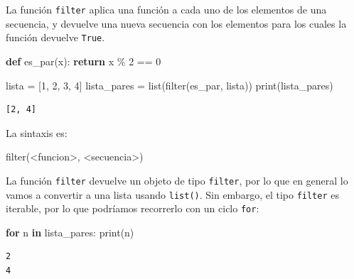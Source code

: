 \documentclass[
  letterpaper,
  DIV=11,
  numbers=noendperiod]{scrreprt}
\newenvironment{Shaded}{\begin{snugshade}}{\end{snugshade}}
\newcommand{\BuiltInTok}[1]{\textcolor[rgb]{0.00,0.23,0.31}{#1}}
\newcommand{\ControlFlowTok}[1]{\textcolor[rgb]{0.00,0.23,0.31}{\textbf{#1}}}
\newcommand{\DecValTok}[1]{\textcolor[rgb]{0.68,0.00,0.00}{#1}}
\newcommand{\KeywordTok}[1]{\textcolor[rgb]{0.00,0.23,0.31}{\textbf{#1}}}
\newcommand{\NormalTok}[1]{\textcolor[rgb]{0.00,0.23,0.31}{#1}}
\newcommand{\OperatorTok}[1]{\textcolor[rgb]{0.37,0.37,0.37}{#1}}
\begin{document}
La función \texttt{filter} aplica una función a cada uno de los
elementos de una secuencia, y devuelve una nueva secuencia con los
elementos para los cuales la función devuelve \texttt{True}.

\begin{Shaded}
\begin{Highlighting}[]
\KeywordTok{def}\NormalTok{ es\_par(x):}
  \ControlFlowTok{return}\NormalTok{ x }\OperatorTok{\%} \DecValTok{2} \OperatorTok{==} \DecValTok{0}

\NormalTok{lista }\OperatorTok{=}\NormalTok{ [}\DecValTok{1}\NormalTok{, }\DecValTok{2}\NormalTok{, }\DecValTok{3}\NormalTok{, }\DecValTok{4}\NormalTok{]}
\NormalTok{lista\_pares }\OperatorTok{=} \BuiltInTok{list}\NormalTok{(}\BuiltInTok{filter}\NormalTok{(es\_par, lista))}
\BuiltInTok{print}\NormalTok{(lista\_pares)}
\end{Highlighting}
\end{Shaded}

\begin{verbatim}
[2, 4]
\end{verbatim}

La sintaxis es:

\begin{Shaded}
\begin{Highlighting}[]
\BuiltInTok{filter}\NormalTok{(}\OperatorTok{\textless{}}\NormalTok{funcion}\OperatorTok{\textgreater{}}\NormalTok{, }\OperatorTok{\textless{}}\NormalTok{secuencia}\OperatorTok{\textgreater{}}\NormalTok{)}
\end{Highlighting}
\end{Shaded}

La función \texttt{filter} devuelve un objeto de tipo \texttt{filter},
por lo que en general lo vamos a convertir a una lista usando
\texttt{list()}. Sin embargo, el tipo \texttt{filter} es iterable, por
lo que podríamos recorrerlo con un ciclo \texttt{for}:

\begin{Shaded}
\begin{Highlighting}[]
\ControlFlowTok{for}\NormalTok{ n }\KeywordTok{in}\NormalTok{ lista\_pares:}
  \BuiltInTok{print}\NormalTok{(n)}
\end{Highlighting}
\end{Shaded}

\begin{verbatim}
2
4
\end{verbatim}
\end{document}
